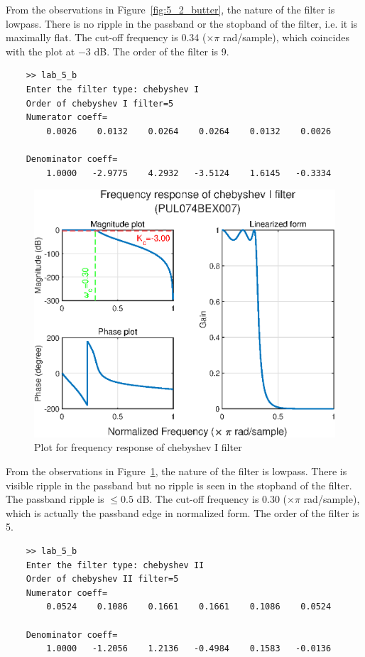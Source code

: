 \documentclass{lab_sheet}
\begin{document}
From the observations in Figure~\ref{fig:5_2_butter}, the nature of the filter is lowpass. There is no ripple in the passband or the stopband of the filter, i.e. it is maximally flat. The cut-off frequency is 0.34 ($\times \pi$ rad/sample), which coincides with the plot at $-3$ dB. The order of the filter is 9.  
\begin{verbatim}
    >> lab_5_b
    Enter the filter type: chebyshev I
    Order of chebyshev I filter=5
    Numerator coeff=
        0.0026    0.0132    0.0264    0.0264    0.0132    0.0026

    Denominator coeff=
        1.0000   -2.9775    4.2932   -3.5124    1.6145   -0.3334
\end{verbatim}
\begin{figure}[H]
    \centering
    \includegraphics[width=0.8\linewidth]{../Figures/chebyshev I.eps}
    \caption{Plot for frequency response of chebyshev I filter}
    \label{fig:5_2_cheby1}
\end{figure}
From the observations in Figure~\ref{fig:5_2_cheby1}, the nature of the filter is lowpass. There is visible ripple in the passband but no ripple is seen in the stopband of the filter. The passband ripple is $\leq0.5$ dB. The cut-off frequency is 0.30 ($\times \pi$ rad/sample), which is actually the passband edge in normalized form. The order of the filter is 5.  
\begin{verbatim}
    >> lab_5_b
    Enter the filter type: chebyshev II
    Order of chebyshev II filter=5
    Numerator coeff=
        0.0524    0.1086    0.1661    0.1661    0.1086    0.0524

    Denominator coeff=
        1.0000   -1.2056    1.2136   -0.4984    0.1583   -0.0136
\end{verbatim}
\end{document}
